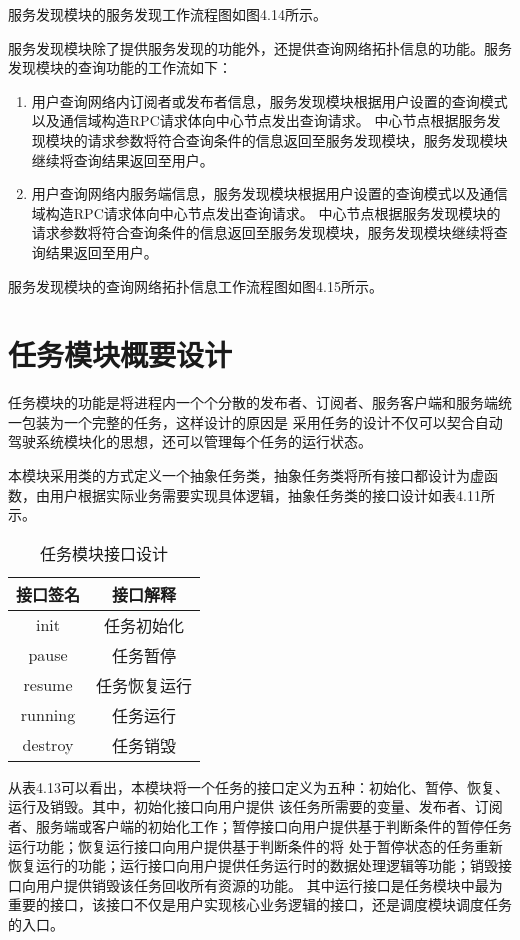 服务发现模块的服务发现工作流程图如图4.14所示。

服务发现模块除了提供服务发现的功能外，还提供查询网络拓扑信息的功能。服务发现模块的查询功能的工作流如下：
\begin{enumerate}
  \item 用户查询网络内订阅者或发布者信息，服务发现模块根据用户设置的查询模式以及通信域构造RPC请求体向中心节点发出查询请求。
  中心节点根据服务发现模块的请求参数将符合查询条件的信息返回至服务发现模块，服务发现模块继续将查询结果返回至用户。
  \item 用户查询网络内服务端信息，服务发现模块根据用户设置的查询模式以及通信域构造RPC请求体向中心节点发出查询请求。
  中心节点根据服务发现模块的请求参数将符合查询条件的信息返回至服务发现模块，服务发现模块继续将查询结果返回至用户。
\end{enumerate}

服务发现模块的查询网络拓扑信息工作流程图如图4.15所示。

\section{任务模块概要设计}
任务模块的功能是将进程内一个个分散的发布者、订阅者、服务客户端和服务端统一包装为一个完整的任务，这样设计的原因是
采用任务的设计不仅可以契合自动驾驶系统模块化的思想，还可以管理每个任务的运行状态。

本模块采用类的方式定义一个抽象任务类，抽象任务类将所有接口都设计为虚函数，由用户根据实际业务需要实现具体逻辑，抽象任务类的接口设计如表4.11所示。
\begin{table}[htb]
  \centering\small
  \caption{任务模块接口设计}
  \label{tab:exampletable}
  \begin{tabular}{cc}
    \toprule
    接口签名 & 接口解释 \\
    \midrule
    init & 任务初始化 \\
    pause & 任务暂停\\
    resume & 任务恢复运行\\
    running & 任务运行\\
    destroy & 任务销毁\\
    \bottomrule
  \end{tabular}
\end{table}

从表4.13可以看出，本模块将一个任务的接口定义为五种：初始化、暂停、恢复、运行及销毁。其中，初始化接口向用户提供
该任务所需要的变量、发布者、订阅者、服务端或客户端的初始化工作；暂停接口向用户提供基于判断条件的暂停任务运行功能；恢复运行接口向用户提供基于判断条件的将
处于暂停状态的任务重新恢复运行的功能；运行接口向用户提供任务运行时的数据处理逻辑等功能；销毁接口向用户提供销毁该任务回收所有资源的功能。
其中运行接口是任务模块中最为重要的接口，该接口不仅是用户实现核心业务逻辑的接口，还是调度模块调度任务的入口。

